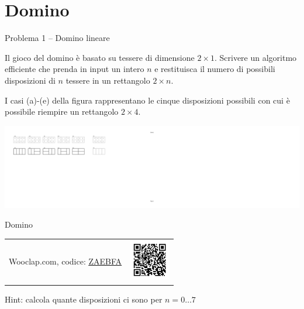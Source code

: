 \section{Domino}

\begin{frame}{Problema 1 -- Domino lineare}

\vspace{-9pt}
\begin{myboxtitle}[Definizione]
Il gioco del domino è basato su tessere di dimensione $2 \times 1$. Scrivere
un algoritmo efficiente che prenda in input un intero $n$ e restituisca il numero di possibili disposizioni di $n$ tessere in un rettangolo $2 \times n$.
\end{myboxtitle}

\begin{myboxtitle}[Esempio]
I casi (a)-(e) della figura rappresentano le cinque disposizioni possibili con cui è possibile riempire un rettangolo $2 \times 4$. 
\end{myboxtitle}

\begin{center}
\includegraphics[width=1.0\textwidth]{domino.pdf}
\end{center}

\end{frame}


\begin{frame}[fragile]{Domino}

\vspace{-9pt}

\begin{center}
\begin{tabular}{m{7cm}m{3cm}}
Wooclap.com, codice: \href{https://app.wooclap.com/ZAEBFA}{\alert{\underline{ZAEBFA}}}
&
\includegraphics[width=1.8cm]{qrcode-13-pd1.png}\\
\end{tabular}
\end{center}

\bigskip
Hint: calcola quante disposizioni ci sono per $n=0 \ldots 7$ 

\bigskip
{}


\end{frame}

